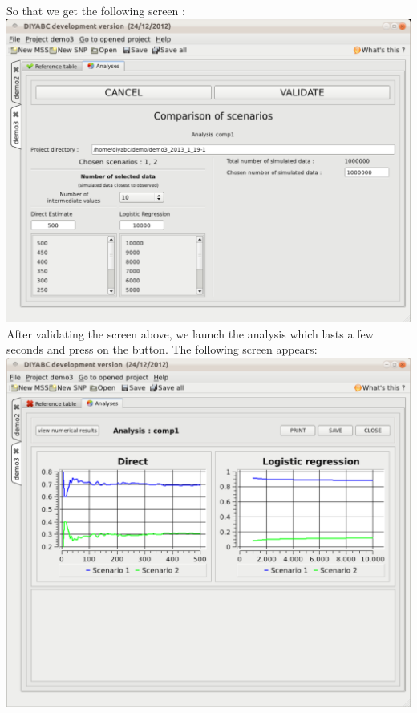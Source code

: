 So that we get the following screen :\\

\includegraphics[scale=0.3]{gui_pictures/Capture-DIYABC-110.png} \\

After validating the screen above, we launch the analysis which lasts a few seconds and press on the  button. The following screen appears:\\

 \includegraphics[scale=0.3]{gui_pictures/Capture-DIYABC-111.png} \\

